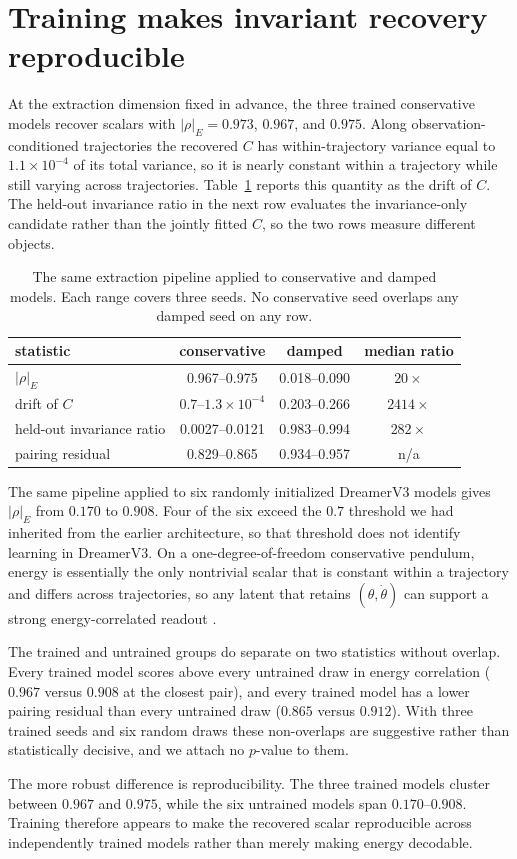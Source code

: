\section{Training makes invariant recovery reproducible}
\label{sec:recovery}

At the extraction dimension fixed in advance, the three trained conservative models recover scalars
with $|\rho|_E = 0.973$, $0.967$, and $0.975$. Along observation-conditioned trajectories the
recovered $C$ has within-trajectory variance equal to $1.1\times10^{-4}$ of its total variance, so it
is nearly constant within a trajectory while still varying across trajectories.
Table~\ref{tab:refusal} reports this quantity as the drift of $C$. The held-out invariance ratio in
the next row evaluates the invariance-only candidate rather than the jointly fitted $C$, so the two
rows measure different objects.

\begin{table}[t]
\centering\small
\caption{The same extraction pipeline applied to conservative and damped models. Each range covers
three seeds. No conservative seed overlaps any damped seed on any row.}
\label{tab:refusal}
\begin{tabular}{lccc}
\toprule
statistic & conservative & damped & median ratio \\
\midrule
$|\rho|_E$ & 0.967--0.975 & 0.018--0.090 & $20\times$ \\
drift of $C$ & $0.7$--$1.3\times10^{-4}$ & 0.203--0.266 & $2414\times$ \\
held-out invariance ratio & 0.0027--0.0121 & 0.983--0.994 & $282\times$ \\
pairing residual & 0.829--0.865 & 0.934--0.957 & n/a \\
\bottomrule
\end{tabular}
\end{table}

The same pipeline applied to six randomly initialized DreamerV3 models gives $|\rho|_E$ from $0.170$
to $0.908$. Four of the six exceed the $0.7$ threshold we had inherited from the earlier
architecture, so that threshold does not identify learning in DreamerV3. On a one-degree-of-freedom
conservative pendulum, energy is essentially the only nontrivial scalar that is constant within a
trajectory and differs across trajectories, so any latent that retains $(\theta,\dot\theta)$ can
support a strong energy-correlated readout \citep{hewitt2019control,belinkov2022probing}.

The trained and untrained groups do separate on two statistics without overlap. Every trained model
scores above every untrained draw in energy correlation ($0.967$ versus $0.908$ at the closest
pair), and every trained model has a lower pairing residual than every untrained draw ($0.865$
versus $0.912$). With three trained seeds and six random draws these non-overlaps are suggestive
rather than statistically decisive, and we attach no $p$-value to them.

The more robust difference is reproducibility. The three trained models cluster between $0.967$ and
$0.975$, while the six untrained models span $0.170$--$0.908$. Training therefore appears to make
the recovered scalar reproducible across independently trained models rather than merely making
energy decodable.
